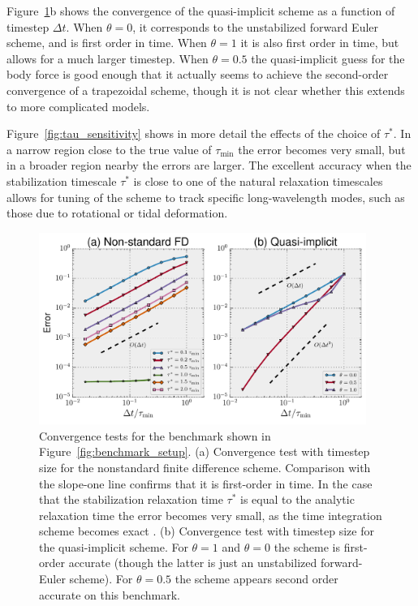 \documentclass[preprint,12pt,authoryear]{elsarticle}
\begin{document}
Figure~\ref{fig:timestep_convergence}b shows the convergence of the quasi-implicit scheme as a function of timestep $\Delta t$.
When $\theta=0$, it corresponds to the unstabilized forward Euler scheme, and is first order in time. 
When $\theta=1$ it is also first order in time, but allows for a much larger timestep.  When $\theta=0.5$
the quasi-implicit guess for the body force is good enough that it actually seems to achieve the second-order 
convergence of a trapezoidal scheme, though it is not clear whether this extends to more complicated models.

Figure~\ref{fig:tau_sensitivity} shows in more detail the effects of the choice of $\tau^*$. In a narrow region 
close to the true value of $\tau_\mathrm{min}$ the error becomes very small, but in a broader region nearby 
the errors are larger. 
The excellent accuracy when the stabilization timescale $\tau^*$ is close to one of the natural relaxation
timescales allows for tuning of the scheme to track specific long-wavelength modes, such as 
those due to rotational or tidal deformation.

\begin{figure}
\includegraphics[width=0.95\textwidth]{figures/timestep_convergence.pdf}
\caption{Convergence tests for the benchmark shown in Figure~\ref{fig:benchmark_setup}. (a) Convergence test with timestep size for the nonstandard finite difference scheme. Comparison with the slope-one line confirms that it is first-order in time. In the case that the stabilization relaxation time $\tau^*$ is equal to the analytic relaxation time the error becomes very small, as the time integration scheme becomes exact \citep{mickens2002nonstandard}. (b) Convergence test with timestep size for the quasi-implicit scheme. For $\theta = 1$ and $\theta = 0$ the scheme is first-order accurate (though the latter is just an unstabilized forward-Euler scheme). For $\theta=0.5$ the scheme appears second order accurate on this benchmark.}
\label{fig:timestep_convergence}
\end{figure}
\end{document}
